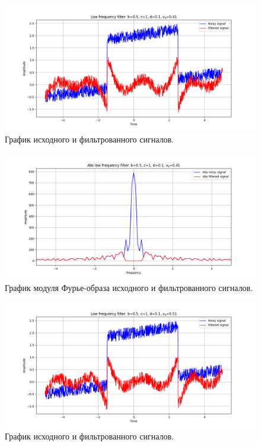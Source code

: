 \documentclass[a4paper, 12pt]{article}
\begin{document}
    \begin{figure}[!htb]
        \centering
        \includegraphics[scale=0.485]{4_u_flt_u_nolow.png}
        \captionsetup{skip=0pt}
        \caption{График исходного и фильтрованного сигналов.}
        \label{fig:fig33}
    \end{figure}
    \begin{figure}[!htb]
        \centering
        \includegraphics[scale=0.485]{4_abs_u_U_nolow.png}
        \captionsetup{skip=0pt}
        \caption{График модуля Фурье-образа исходного и фильтрованного сигналов.}
        \label{fig:fig34}
    \end{figure}
    \begin{figure}[!htb]
        \centering
        \includegraphics[scale=0.485]{5_u_flt_u_nolow.png}
        \captionsetup{skip=0pt}
        \caption{График исходного и фильтрованного сигналов.}
        \label{fig:fig35}
    \end{figure}
\end{document}
